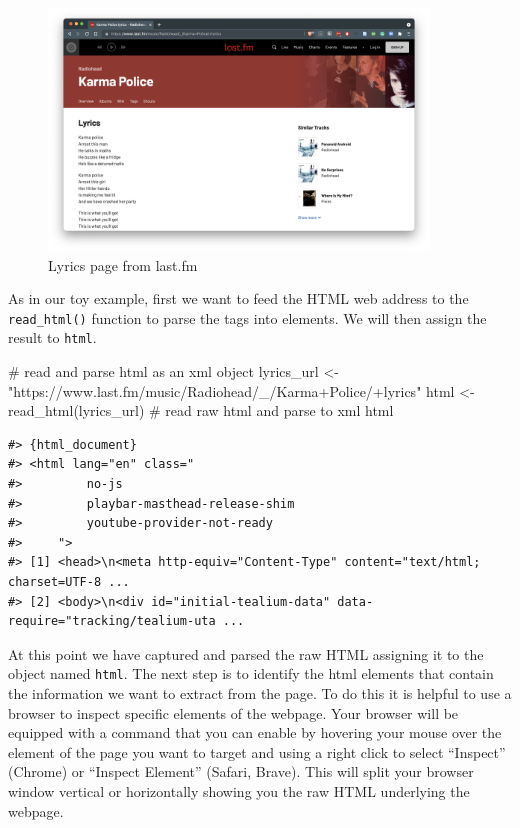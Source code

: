 \documentclass[
  letterpaper,
]{latex/krantz}
\newenvironment{Shaded}{\begin{snugshade}}{\end{snugshade}}
\newcommand{\CommentTok}[1]{\textcolor[rgb]{0.37,0.37,0.37}{#1}}
\newcommand{\FunctionTok}[1]{\textcolor[rgb]{0.28,0.35,0.67}{#1}}
\newcommand{\NormalTok}[1]{\textcolor[rgb]{0.00,0.23,0.31}{#1}}
\newcommand{\OtherTok}[1]{\textcolor[rgb]{0.00,0.23,0.31}{#1}}
\newcommand{\StringTok}[1]{\textcolor[rgb]{0.13,0.47,0.30}{#1}}
\begin{document}
\begin{figure}

{\centering \includegraphics[width=0.9\textwidth,height=\textheight]{./figures/acquire-data/ad-lastfm-webpage-lyrics.png}

}

\caption{\label{fig-ad-example-lyrics-page-lastfm}Lyrics page from
last.fm}

\end{figure}

As in our toy example, first we want to feed the HTML web address to the
\texttt{read\_html()} function to parse the tags into elements. We will
then assign the result to \texttt{html}.

\begin{Shaded}
\begin{Highlighting}[]
\CommentTok{\# read and parse html as an xml object}
\NormalTok{lyrics\_url }\OtherTok{\textless{}{-}} \StringTok{"https://www.last.fm/music/Radiohead/\_/Karma+Police/+lyrics"}
\NormalTok{html }\OtherTok{\textless{}{-}} \FunctionTok{read\_html}\NormalTok{(lyrics\_url) }\CommentTok{\# read raw html and parse to xml}
\NormalTok{html}
\end{Highlighting}
\end{Shaded}

\begin{verbatim}
#> {html_document}
#> <html lang="en" class="
#>         no-js
#>         playbar-masthead-release-shim
#>         youtube-provider-not-ready
#>     ">
#> [1] <head>\n<meta http-equiv="Content-Type" content="text/html; charset=UTF-8 ...
#> [2] <body>\n<div id="initial-tealium-data" data-require="tracking/tealium-uta ...
\end{verbatim}

At this point we have captured and parsed the raw HTML assigning it to
the object named \texttt{html}. The next step is to identify the html
elements that contain the information we want to extract from the page.
To do this it is helpful to use a browser to inspect specific elements
of the webpage. Your browser will be equipped with a command that you
can enable by hovering your mouse over the element of the page you want
to target and using a right click to select ``Inspect'' (Chrome) or
``Inspect Element'' (Safari, Brave). This will split your browser window
vertical or horizontally showing you the raw HTML underlying the
webpage.
\end{document}
